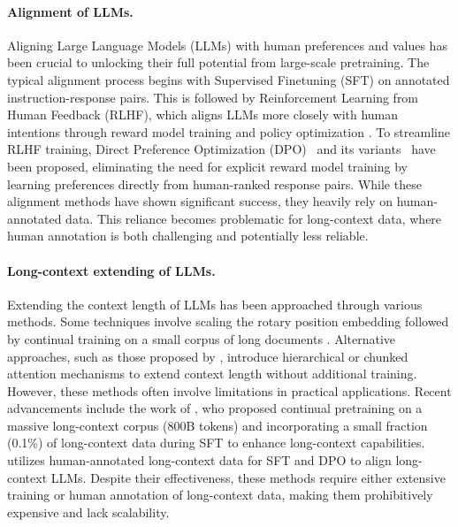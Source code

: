 \paragraph{Alignment of LLMs.} 
Aligning Large Language Models (LLMs) with human preferences and values has been crucial to unlocking their full potential from large-scale pretraining. The typical alignment process begins with Supervised Finetuning (SFT) on annotated instruction-response pairs. This is followed by Reinforcement Learning from Human Feedback (RLHF), which aligns LLMs more closely with human intentions through reward model training and policy optimization \citep{christiano2017deep,Ouyang2022TrainingLM, Bai2022ConstitutionalAH,stiennon2020learning}. To streamline RLHF training, Direct Preference Optimization (DPO)~\citep{Rafailov2023DirectPO} and its variants~\citep{Ethayarajh2024KTOMA, Azar2023AGT, Pang2024IterativeRP, Hong2024ORPOMP, Meng2024SimPOSP} have been proposed, eliminating the need for explicit reward model training by learning preferences directly from human-ranked response pairs. While these alignment methods have shown significant success, they heavily rely on human-annotated data. This reliance becomes problematic for long-context data, where human annotation is both challenging and potentially less reliable.

\paragraph{Long-context extending of LLMs.}
Extending the context length of LLMs has been approached through various methods. Some techniques involve scaling the rotary position embedding \citep{su2022roformer} followed by continual training on a small corpus of long documents \citep{chen2023extending, peng2023yarn, rozière2023code, Chen2023CLEXCL}. Alternative approaches, such as those proposed by \citet{jin2024llm, an2024trainingfree}, introduce hierarchical or chunked attention mechanisms to extend context length without additional training. However, these methods often involve limitations in practical applications. Recent advancements include the work of \citet{dubey2024llama3herdmodels}, who proposed continual pretraining on a massive long-context corpus (800B tokens) and incorporating a small fraction (0.1\%) of long-context data during SFT to enhance long-context capabilities. \citet{Zeng2024ChatGLMAF} utilizes human-annotated long-context data for SFT and DPO to align long-context LLMs. Despite their effectiveness, these methods require either extensive training or human annotation of long-context data, making them prohibitively expensive and lack scalability.


